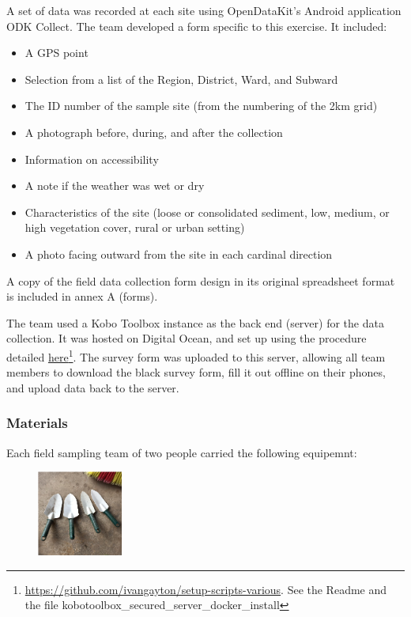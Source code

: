 \documentclass[a4paper,12pt]{article}
\begin{document}
A set of data was recorded at each site using OpenDataKit's Android application ODK Collect. The team developed a form specific to this exercise. It included:
\begin{itemize}
  \item A GPS point
  \item Selection from a list of the Region, District, Ward, and Subward
  \item The ID number of the sample site (from the numbering of the 2km grid)
  \item A photograph before, during, and after the collection
  \item Information on accessibility
  \item A note if the weather was wet or dry
  \item Characteristics of the site (loose or consolidated sediment, low, medium, or high vegetation cover, rural or urban setting)
  \item A photo facing outward from the site in each cardinal direction
\end{itemize}

A copy of the field data collection form design in its original spreadsheet format is included in annex A (forms).

The team used a Kobo Toolbox instance as the back end (server) for the data collection. It was hosted on Digital Ocean, and set up using the procedure detailed \href{https://github.com/ivangayton/setup-scripts-various}{here}\footnote{\url {https://github.com/ivangayton/setup-scripts-various}. See the Readme and the file kobotoolbox\_secured\_server\_docker\_install}. The survey form was uploaded to this server, allowing all team members to download the black survey form, fill it out offline on their phones, and upload data back to the server. 

\newpage
\subsubsection{Materials}
Each field sampling team of two people carried the following equipemnt:
\begin{figure} %
  \centering
  \includegraphics[width=0.25\textwidth]{trowels.png}
\end{figure}
\end{document}
